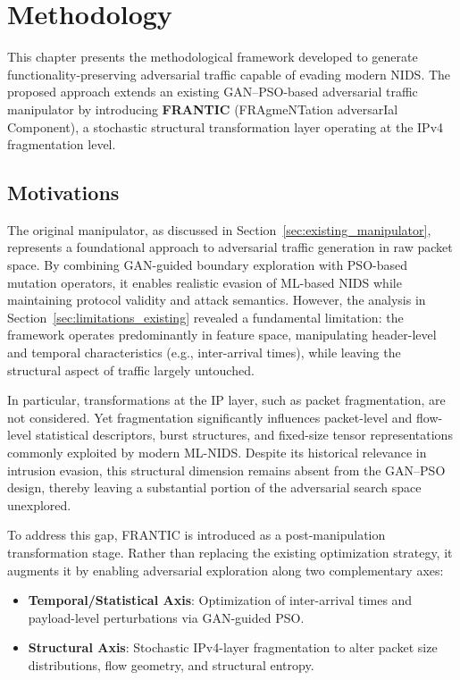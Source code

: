 \chapter{Methodology}
\label{cha:methodology}

This chapter presents the methodological framework developed to generate functionality-preserving adversarial traffic capable of evading modern NIDS. The proposed approach extends an existing GAN–PSO-based adversarial traffic manipulator by introducing \textbf{FRANTIC} (FRAgmeNTation adversarIal Component), a stochastic structural transformation layer operating at the IPv4 fragmentation level.

\section{Motivations}
The original manipulator, as discussed in Section~\ref{sec:existing_manipulator}, represents a foundational approach to adversarial traffic generation in raw packet space. By combining GAN-guided boundary exploration with PSO-based mutation operators, it enables realistic evasion of ML-based NIDS while maintaining protocol validity and attack semantics. However, the analysis in Section~\ref{sec:limitations_existing} revealed a fundamental limitation: the framework operates predominantly in feature space, manipulating header-level and temporal characteristics (e.g., inter-arrival times), while leaving the structural aspect of traffic largely untouched.

In particular, transformations at the IP layer, such as packet fragmentation, are not considered. Yet fragmentation significantly influences packet-level and flow-level statistical descriptors, burst structures, and fixed-size tensor representations commonly exploited by modern ML-NIDS. Despite its historical relevance in intrusion evasion, this structural dimension remains absent from the GAN–PSO design, thereby leaving a substantial portion of the adversarial search space unexplored.

To address this gap, FRANTIC is introduced as a post-manipulation transformation stage. Rather than replacing the existing optimization strategy, it augments it by enabling adversarial exploration along two complementary axes:

\begin{itemize}
    \item \textbf{Temporal/Statistical Axis}: Optimization of inter-arrival times and payload-level perturbations via GAN-guided PSO.
    \item \textbf{Structural Axis}: Stochastic IPv4-layer fragmentation to alter packet size distributions, flow geometry, and structural entropy.
\end{itemize}

